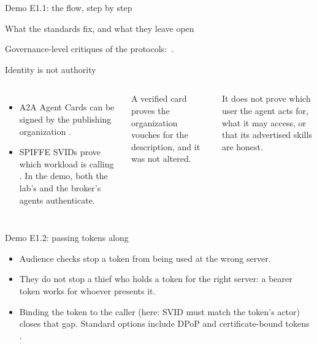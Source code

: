 \documentclass[aspectratio=169, 10pt]{beamer}
\begin{document}
\begin{frame}{Demo E1.1: the flow, step by step}
  \centering{}
\end{frame}

\begin{frame}{What the standards fix, and what they leave open}
  \centering{}\par
  \vspace{2mm}
  {\small Governance-level critiques of the protocols: \,\pre.}
\end{frame}

\begin{frame}{Identity is not authority}
  \begin{columns}[T]
    \par
    \vspace{3mm}
    \begin{itemize}\scriptsize
      \item A2A Agent Cards can be signed by the publishing organization .
      \item SPIFFE SVIDs prove which workload is calling . In the demo, both the lab's and the broker's agents authenticate.
    \end{itemize}
    \begin{exampleblock}{A verified card proves}\scriptsize
      the organization vouches for the description, and it was not altered.
    \end{exampleblock}
    \begin{alertblock}{It does not prove}\scriptsize
      which user the agent acts for, what it may access, or that its advertised skills are honest.
    \end{alertblock}
  \end{columns}
\end{frame}

\begin{frame}{Demo E1.2: passing tokens along}
  \centering{}\par
  \vspace{3mm}
  \begin{itemize}\small
    \item Audience checks stop a token from being used at the wrong server.
    \item They do not stop a thief who holds a token for the right server: a bearer token works for whoever presents it.
    \item Binding the token to the caller (here: SVID must match the token's actor) closes that gap. Standard options include DPoP  and certificate-bound tokens .
  \end{itemize}
\end{frame}
\end{document}
